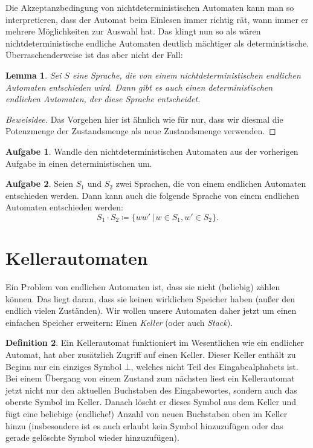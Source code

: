 \documentclass[a4paper,ngerman,12pt]{scrartcl}
\theoremstyle{definition}
\newtheorem{defn}{Definition}[]
\newtheorem{aufg}{Aufgabe}
\theoremstyle{plain}
\newtheorem{lemma}[defn]{Lemma}
\theoremstyle{remark}
\begin{document}
Die Akzeptanzbedingung von nichtdeterministischen Automaten kann man so interpretieren, dass der Automat beim Einlesen immer richtig rät, wann immer er mehrere Möglichkeiten zur Auswahl hat. Das klingt nun so als wären nichtdeterministische endliche Automaten deutlich mächtiger als deterministische. Überraschenderweise ist das aber nicht der Fall:

\begin{lemma}
	Sei $S$ eine Sprache, die von einem nichtdeterministischen endlichen Automaten entschieden wird. Dann gibt es auch einen deterministischen endlichen Automaten, der diese Sprache entscheidet.
\end{lemma}

\begin{proof}[Beweisidee]
	Das Vorgehen hier ist ähnlich wie für  nur, dass wir diesmal die Potenzmenge der Zustandsmenge als neue Zustandsmenge verwenden.
\end{proof}

\begin{aufg}
	Wandle den nichtdeterministischen Automaten aus der vorherigen Aufgabe in einen deterministischen um.
\end{aufg}

\begin{aufg}
	Seien $S_1$ und $S_2$ zwei Sprachen, die von einem endlichen Automaten entschieden werden. Dann kann auch die folgende Sprache von einem endlichen Automaten entschieden werden:
		\[S_1\cdot S_2 \coloneqq \{ww' \,|\, w \in S_1, w' \in S_2\}.\]
\end{aufg}

\section{Kellerautomaten}

Ein Problem von endlichen Automaten ist, dass sie nicht (beliebig) zählen können. Das liegt daran, dass sie keinen wirklichen Speicher haben (außer den endlich vielen Zuständen). Wir wollen unsere Automaten daher jetzt um einen einfachen Speicher erweitern: Einen \emph{Keller} (oder auch \emph{Stack}).

\begin{defn}
	Ein Kellerautomat funktioniert im Wesentlichen wie ein endlicher Automat, hat aber zusätzlich Zugriff auf einen Keller. Dieser Keller enthält zu Beginn nur ein einziges Symbol $\bot$, welches nicht Teil des Eingabealphabets ist. Bei einem Übergang von einem Zustand zum nächsten liest ein Kellerautomat jetzt nicht nur den aktuellen Buchstaben des Eingabewortes, sondern auch das oberste Symbol im Keller. Danach löscht er dieses Symbol aus dem Keller und fügt eine beliebige (endliche!) Anzahl von neuen Buchstaben oben im Keller hinzu (insbesondere ist es auch erlaubt kein Symbol hinzuzufügen oder das gerade gelöschte Symbol wieder hinzuzufügen).
\end{defn}
\end{document}
